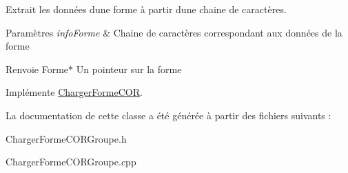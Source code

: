 Extrait les données d\textquotesingle{}une forme à partir d\textquotesingle{}une chaine de caractères. 


\begin{DoxyParams}{Paramètres}
{\em info\+Forme} & Chaine de caractères correspondant aux données de la forme \\
\hline
\end{DoxyParams}
\begin{DoxyReturn}{Renvoie}
Forme$\ast$ Un pointeur sur la forme 
\end{DoxyReturn}


Implémente \mbox{\hyperlink{class_charger_forme_c_o_r_a1d9563c3a1ff9d6d86aa87a83bdaf8da}{Charger\+Forme\+C\+OR}}.



La documentation de cette classe a été générée à partir des fichiers suivants \+:\begin{DoxyCompactItemize}
\item 
Charger\+Forme\+C\+O\+R\+Groupe.\+h\item 
Charger\+Forme\+C\+O\+R\+Groupe.\+cpp\end{DoxyCompactItemize}
